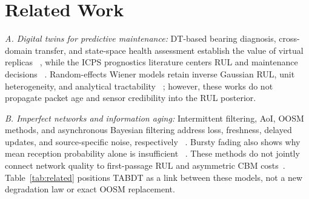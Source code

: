 \documentclass[journal]{IEEEtran}
\begin{document}
\section{Related Work}\label{sec:related}

\emph{A. Digital twins for predictive maintenance:}
DT-based bearing diagnosis, cross-domain transfer, and state-space health
assessment establish the value of virtual replicas
~\cite{feng2023ticps,samanazari2024ticps,kumar2025ticps}, while the ICPS
prognostics literature centers RUL and maintenance decisions
~\cite{liu2024ticps}. Random-effects Wiener models retain inverse Gaussian
RUL, unit heterogeneity, and analytical tractability
~\cite{si2014,huang2015,zhai2017}; however, these works do not propagate
packet age and sensor credibility into the RUL posterior.

\emph{B. Imperfect networks and information aging:}
Intermittent filtering, AoI, OOSM methods, and asynchronous Bayesian filtering
address loss, freshness, delayed updates, and source-specific noise,
respectively
~\cite{sinopoli2004,yates2021,barshalom2002,barshalom2004,greiff2024cdc}.
Bursty fading also shows why mean reception probability alone is insufficient
~\cite{quevedo2013tac}. These methods do not jointly connect network quality
to first-passage RUL and asymmetric CBM costs~\cite{yang2024tr}.
Table~\ref{tab:related} positions TABDT as a link between these models, not a
new degradation law or exact OOSM replacement.
\end{document}
